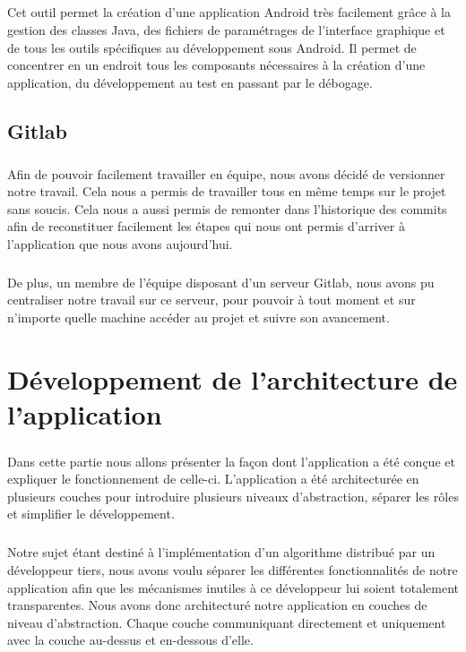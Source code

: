 \documentclass[a4paper,10pt]{report}
\begin{document}
  \paragraph{}
  Cet outil permet la création d'une application Android très facilement grâce à la gestion des classes Java, des fichiers de paramétrages de l'interface graphique et de tous les outils spécifiques au développement sous Android. Il permet de concentrer en un endroit tous les composants nécessaires à la création d'une application, du développement au test en passant par le débogage.
  \section{Gitlab}
  \paragraph{}
  Afin de pouvoir facilement travailler en équipe, nous avons décidé de versionner notre travail. Cela nous a permis de travailler tous en même temps sur le projet sans soucis. Cela nous a aussi permis de remonter dans l'historique des commits afin de reconstituer facilement les étapes qui nous ont permis d'arriver à l'application que nous avons aujourd'hui.
  \paragraph{}
  De plus, un membre de l'équipe disposant d'un serveur Gitlab, nous avons pu centraliser notre travail sur ce serveur, pour pouvoir à tout moment et sur n'importe quelle machine accéder au projet et suivre son avancement.
  
\chapter{Développement de l'architecture de l'application}
  \paragraph{}
  Dans cette partie nous allons présenter la façon dont l'application a été conçue et expliquer le fonctionnement de celle-ci. L'application a été architecturée en plusieurs couches pour introduire plusieurs niveaux d'abstraction, séparer les rôles et simplifier le développement.
  \paragraph{}
  Notre sujet étant destiné à l'implémentation d'un algorithme distribué par un développeur tiers, nous avons voulu séparer les différentes fonctionnalités de notre application afin que les mécanismes inutiles à ce développeur lui soient totalement transparentes. Nous avons donc architecturé notre application en couches de niveau d'abstraction. Chaque couche communiquant directement et uniquement avec la couche au-dessus et en-dessous d'elle.
  
\end{document}
